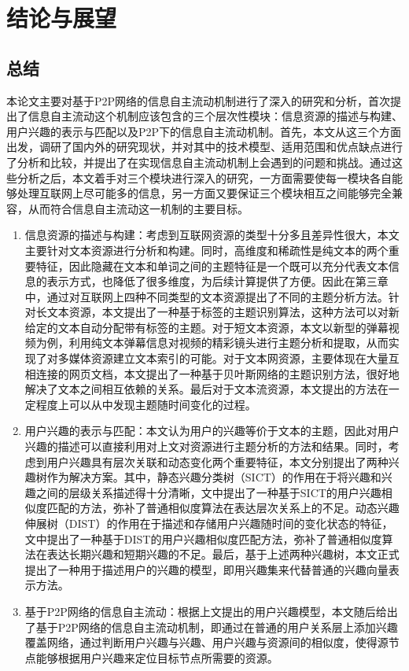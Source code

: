 \section{结论与展望}

\subsection{总结}
本论文主要对基于P2P网络的信息自主流动机制进行了深入的研究和分析，首次提出了信息自主流动这个机制应该包含的三个层次性模块：信息资源的描述与构建、用户兴趣的表示与匹配以及P2P下的信息自主流动机制。首先，本文从这三个方面出发，调研了国内外的研究现状，并对其中的技术模型、适用范围和优点缺点进行了分析和比较，并提出了在实现信息自主流动机制上会遇到的问题和挑战。通过这些分析之后，本文着手对三个模块进行深入的研究，一方面需要使每一模块各自能够处理互联网上尽可能多的信息，另一方面又要保证三个模块相互之间能够完全兼容，从而符合信息自主流动这一机制的主要目标。

\begin{enumerate}
  \item 信息资源的描述与构建：考虑到互联网资源的类型十分多且差异性很大，本文主要针对文本资源进行分析和构建。同时，高维度和稀疏性是纯文本的两个重要特征，因此隐藏在文本和单词之间的主题特征是一个既可以充分代表文本信息的表示方式，也降低了很多维度，为后续计算提供了方便。因此在第三章中，通过对互联网上四种不同类型的文本资源提出了不同的主题分析方法。针对长文本资源，本文提出了一种基于标签的主题识别算法，这种方法可以对新给定的文本自动分配带有标签的主题。对于短文本资源，本文以新型的弹幕视频为例，利用纯文本弹幕信息对视频的精彩镜头进行主题分析和提取，从而实现了对多媒体资源建立文本索引的可能。对于文本网资源，主要体现在大量互相连接的网页文档，本文提出了一种基于贝叶斯网络的主题识别方法，很好地解决了文本之间相互依赖的关系。最后对于文本流资源，本文提出的方法在一定程度上可以从中发现主题随时间变化的过程。
  \item 用户兴趣的表示与匹配：本文认为用户的兴趣等价于文本的主题，因此对用户兴趣的描述可以直接利用对上文对资源进行主题分析的方法和结果。同时，考虑到用户兴趣具有层次关联和动态变化两个重要特征，本文分别提出了两种兴趣树作为解决方案。其中，静态兴趣分类树（SICT）的作用在于将兴趣和兴趣之间的层级关系描述得十分清晰，文中提出了一种基于SICT的用户兴趣相似度匹配的方法，弥补了普通相似度算法在表达层次关系上的不足。动态兴趣伸展树（DIST）的作用在于描述和存储用户兴趣随时间的变化状态的特征，文中提出了一种基于DIST的用户兴趣相似度匹配方法，弥补了普通相似度算法在表达长期兴趣和短期兴趣的不足。最后，基于上述两种兴趣树，本文正式提出了一种用于描述用户的兴趣的模型，即用兴趣集来代替普通的兴趣向量表示方法。
  \item 基于P2P网络的信息自主流动：根据上文提出的用户兴趣模型，本文随后给出了基于P2P网络的信息自主流动机制，即通过在普通的用户关系层上添加兴趣覆盖网络，通过判断用户兴趣与兴趣、用户兴趣与资源间的相似度，使得源节点能够根据用户兴趣来定位目标节点所需要的资源。
\end{enumerate}

